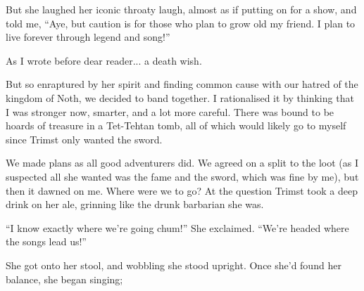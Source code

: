 \documentclass[12pt, a4paper]{book}
\begin{document}
But she laughed her iconic throaty laugh, almost as if putting on for a show, and told me, ``Aye, but caution is for those who plan to grow old my friend. I plan to live forever through legend and song!''

As I wrote before dear reader... a death wish. 

But so enraptured by her spirit and finding common cause with our hatred of the kingdom of Noth, we decided to band together. I rationalised it by thinking that I was stronger now, smarter, and a lot more careful. There was bound to be hoards of treasure in a Tet-Tehtan tomb, all of which would likely go to myself since Trimst only wanted the sword. 

We made plans as all good adventurers did. We agreed on a split to the loot (as I suspected all she wanted was the fame and the sword, which was fine by me), but then it dawned on me. Where were we to go? At the question Trimst took a deep drink on her ale, grinning like the drunk barbarian she was.

``I know exactly where we're going chum!'' She exclaimed. ``We're headed where the songs lead us!''

She got onto her stool, and wobbling she stood upright. Once she'd found her balance, she began singing;

\end{document}
